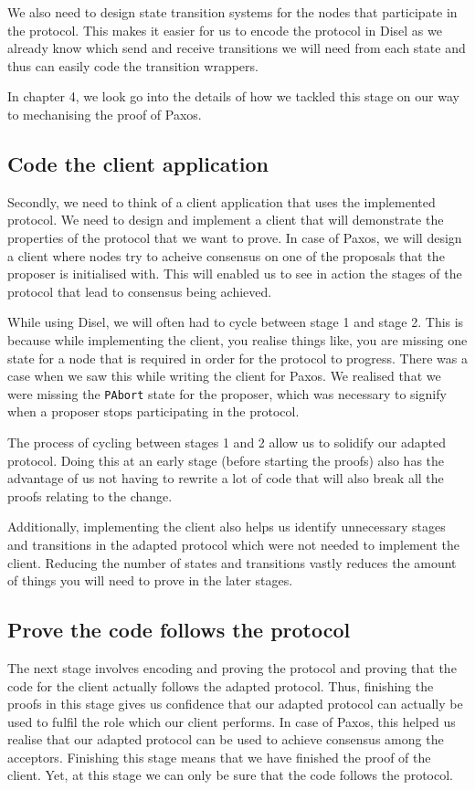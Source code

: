 We also need to design state transition systems for the nodes that participate
in the protocol. This makes it easier for us to encode the protocol in Disel as
we already know which send and receive transitions we will need from each state
and thus can easily code the transition wrappers.

In chapter 4, we look go into the details of how we tackled this stage on our way
to mechanising the proof of Paxos.

\subsection{Code the client application}
Secondly, we need to think of a client application that uses the implemented protocol.
We need to design and implement a client that will demonstrate the properties of the
protocol that we want to prove. In case of Paxos, we will design a client
where nodes try to acheive consensus on one of the proposals that the proposer
is initialised with. This will enabled us to see in action the stages of the protocol
that lead to consensus being achieved.

While using Disel, we will often had to cycle between stage 1 and stage 2.
This is because while implementing the client, you realise things like, you are
missing one state for a node that is required in order for the protocol to progress.
There was a case when we saw this while writing the client for Paxos.
We realised that we were missing the \texttt{PAbort}
state for the proposer, which was necessary to signify when a proposer stops
participating in the protocol.

The process of cycling between stages 1 and 2 allow us to solidify our adapted
protocol. Doing this at an early stage (before starting the proofs)
also has the advantage of us not having to rewrite a lot of code that will also
break all the proofs relating to the change.

Additionally, implementing the client also helps us identify unnecessary stages
and transitions in the adapted protocol which were not needed to implement the
client. Reducing the number of states and transitions vastly reduces the amount
of things you will need to prove in the later stages.

\subsection{Prove the code follows the protocol}
The next stage involves encoding and proving the protocol
and proving that the code for the client actually follows
the adapted protocol. Thus, finishing the proofs in this stage gives us
confidence that our adapted protocol can actually be used to fulfil the role
which our client performs. In case of Paxos, this helped us realise that our
adapted protocol can be used to achieve consensus among the acceptors.
Finishing this stage means that we have finished the proof of the client.
Yet, at this stage we can only be sure that the code follows the protocol.

